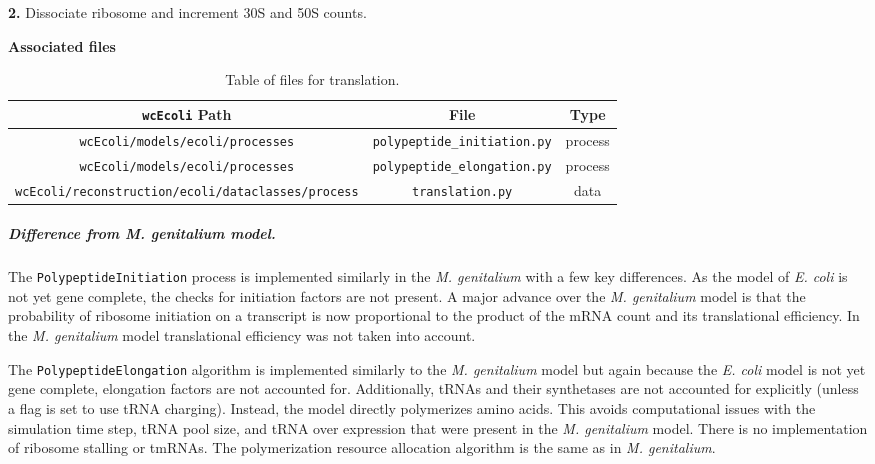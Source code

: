 \documentclass[12pt]{article}
\begin{document}
\begin{algorithm}[H]
{{            \textbf{2.} Dissociate ribosome and increment 30S and 50S counts.

        }
    }

\end{algorithm}


\newpage
\textbf{Associated files}

\begin{table}[h!]
 \centering
 \scriptsize
 \begin{tabular}{c c c}
 \hline
 \texttt{wcEcoli} Path & File & Type \\
 \hline
\texttt{wcEcoli/models/ecoli/processes} & \texttt{polypeptide\_initiation.py} & process \\
\texttt{wcEcoli/models/ecoli/processes} & \texttt{polypeptide\_elongation.py} & process \\
\texttt{wcEcoli/reconstruction/ecoli/dataclasses/process} & \texttt{translation.py} & data \\
 \hline
\end{tabular}
\caption[Table of files for translation]{Table of files for translation.}
\end{table}


\subparagraph{Difference from \emph{M. genitalium} model.}
The \texttt{PolypeptideInitiation} process is implemented similarly in the \emph{M. genitalium} with a few key differences. As the model of \emph{E. coli} is not yet gene complete, the checks for initiation factors are not present. A major advance over the \emph{M. genitalium} model is that the probability of ribosome initiation on a transcript is now proportional to the product of the mRNA count and its translational efficiency. In the \emph{M. genitalium} model translational efficiency was not taken into account.

The \texttt{PolypeptideElongation} algorithm is implemented similarly to the \emph{M. genitalium} model but again because the \emph{E. coli} model is not yet gene complete, elongation factors are not accounted for. Additionally, tRNAs and their synthetases are not accounted for explicitly (unless a flag is set to use tRNA charging). Instead, the model directly polymerizes amino acids. This avoids computational issues with the simulation time step, tRNA pool size, and tRNA over expression that were present in the \emph{M. genitalium} model. There is no implementation of ribosome stalling or tmRNAs. The polymerization resource allocation algorithm is the same as in \emph{M. genitalium}.
\end{document}
